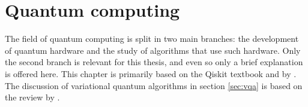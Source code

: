 \chapter{Quantum computing}
\label{chap:quantum}
The field of quantum computing is split in two main branches: the development of quantum hardware and the study of algorithms that use such hardware.
Only the second branch is relevant for this thesis, and even so only a brief explanation is offered here.
This chapter is primarily based on the Qiskit textbook \cite{qiskit_textbook} and  by \textcite{textbook_2nd}.
The discussion of variational quantum algorithms in section \ref{sec:vqa} is based on the review by \textcite{cerezo2021}.









